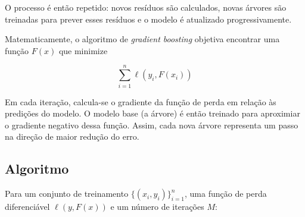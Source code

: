 \documentclass{article}
\begin{document}
O processo é então repetido: novos resíduos são calculados,
novas árvores são treinadas para prever esses resíduos e o modelo
é atualizado progressivamente.

Matematicamente, o algoritmo de \textit{gradient boosting} objetiva 
encontrar uma função $F(x)$ que minimize

\begin{equation}
    \sum_{i = 1}^{n} \ell(y_i, F(x_i))
\end{equation}

Em cada iteração, calcula-se o gradiente da função de perda em 
relação às predições do modelo. O modelo base (a árvore) é então
treinado para aproximiar o gradiente negativo dessa função. Assim,
cada nova árvore representa um passo na direção de maior redução
do erro.

\subsection{Algoritmo}

Para um conjunto de treinamento $\{(x_i, y_i)\}_{i=1}^{n}$, uma função
de perda diferenciável $\ell(y, F(x))$ e um número de iterações $M$:
\end{document}
